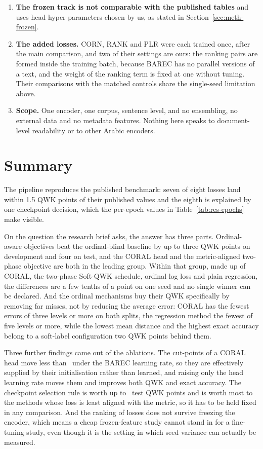 \begin{enumerate}
\item \textbf{The frozen track is not comparable with the published tables} and uses head
hyper-parameters chosen by us, as stated in Section~\ref{sec:meth-frozen}.

\item \textbf{The added losses.} CORN, RANK and PLR were each trained once, after the main
comparison, and two of their settings are ours: the ranking pairs are formed inside the training
batch, because BAREC has no parallel versions of a text, and the weight of the ranking term is
fixed at one without tuning. Their comparisons with the matched controls share the single-seed
limitation above.

\item \textbf{Scope.} One encoder, one corpus, sentence level, and no ensembling, no external
data and no metadata features. Nothing here speaks to document-level readability or to other
Arabic encoders.
\end{enumerate}

\section{Summary}

The pipeline reproduces the published benchmark: seven of eight losses land within 1.5 QWK
points of their published values and the eighth is explained by one checkpoint decision, which
the per-epoch values in Table~\ref{tab:res-epochs} make visible.

On the question the research brief asks, the answer has three parts. Ordinal-aware objectives
beat the ordinal-blind baseline by up to three QWK points on development and four on test, and
the CORAL head and the metric-aligned two-phase objective are both in the leading group.
Within that group, made up of CORAL, the two-phase Soft-QWK schedule, ordinal log loss and
plain regression, the differences are a few tenths of a point on one seed and no single winner
can be declared. And the ordinal mechanisms buy their QWK specifically by removing far misses,
not by reducing the average error: CORAL has the fewest errors of three levels or more on both
splits, the regression method the fewest of five levels or more, while the lowest mean distance
and the highest exact accuracy belong to a soft-label configuration two QWK points behind them.

Three further findings came out of the ablations. The cut-points of a CORAL head move less than
\cutMoveFineCoral\ under the BAREC learning rate, so they are effectively supplied by their
initialisation rather than learned, and raising only the head learning rate moves them and
improves both QWK and exact accuracy. The checkpoint selection rule is worth up to
\qwkselTestGainMax\ test QWK points and is worth most to the methods whose loss is least
aligned with the metric, so it has to be held fixed in any comparison. And the ranking of
losses does not survive freezing the encoder, which means a cheap frozen-feature study cannot
stand in for a fine-tuning study, even though it is the setting in which seed variance can
actually be measured.

